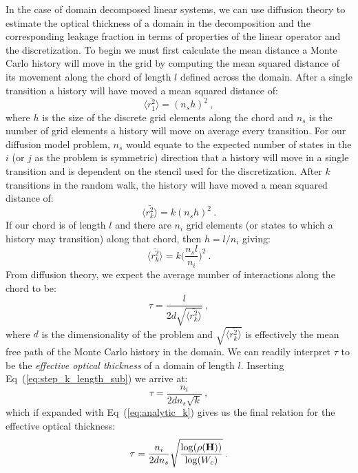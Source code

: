 In the case of domain decomposed linear systems, we can use diffusion
theory to estimate the optical thickness of a domain in the
decomposition and the corresponding leakage fraction in terms of
properties of the linear operator and the discretization. To begin we
must first calculate the mean distance a Monte Carlo history will move
in the grid by computing the mean squared distance of its movement
along the chord of length $l$ defined across the domain. After a
single transition a history will have moved a mean squared distance
of:
\begin{equation}
  \langle \bar{r_1^2} \rangle = (n_s h)^2\:,
  \label{eq:step_1_length}
\end{equation}
where $h$ is the size of the discrete grid elements along the chord
and $n_s$ is the number of grid elements a history will move on
average every transition. For our diffusion model problem, $n_s$ would
equate to the expected number of states in the $i$ (or $j$ as the problem is
symmetric) direction that a history will move in a single
transition and is dependent on the stencil used for the
discretization. After $k$ transitions in the random walk, the history
will have moved a mean squared distance of:
\begin{equation}
  \langle \bar{r_k^2} \rangle = k (n_s h)^2\:.
  \label{eq:step_k_length}
\end{equation}
If our chord is of length $l$ and there are $n_i$ grid elements (or
states to which a history may transition) along that chord, then $h =
l / n_i$ giving:
\begin{equation}
  \langle \bar{r_k^2} \rangle = k \Bigg(\frac{n_s l}{n_i}\Bigg)^2\:.
  \label{eq:step_k_length_sub}
\end{equation}
From diffusion theory, we expect the average number of interactions
along the chord to be:
\begin{equation}
  \tau = \frac{l}{2 d \sqrt{\langle \bar{r_k^2} \rangle}}\:,
  \label{eq:optical_thickness_1}
\end{equation}
where $d$ is the dimensionality of the problem and $\sqrt{\langle
  \bar{r_k^2} \rangle}$ is effectively the mean free path of the Monte
Carlo history in the domain. We can readily interpret $\tau$ to be the
\textit{effective optical thickness} of a domain of length
$l$. Inserting Eq~(\ref{eq:step_k_length_sub}) we arrive at:
\begin{equation}
  \tau = \frac{n_i}{2 d n_s \sqrt{k}}\:,
  \label{eq:optical_thickness_2}
\end{equation}
which if expanded with Eq~(\ref{eq:analytic_k}) gives us the final
relation for the effective optical thickness:
\begin{equation}
  \tau = \frac{n_i}{2 d n_s}
  \sqrt{\frac{\log(\rho(\mathbf{H}))}{\log(W_c)}}\:.
  \label{eq:optical_thickness_3}
\end{equation}

